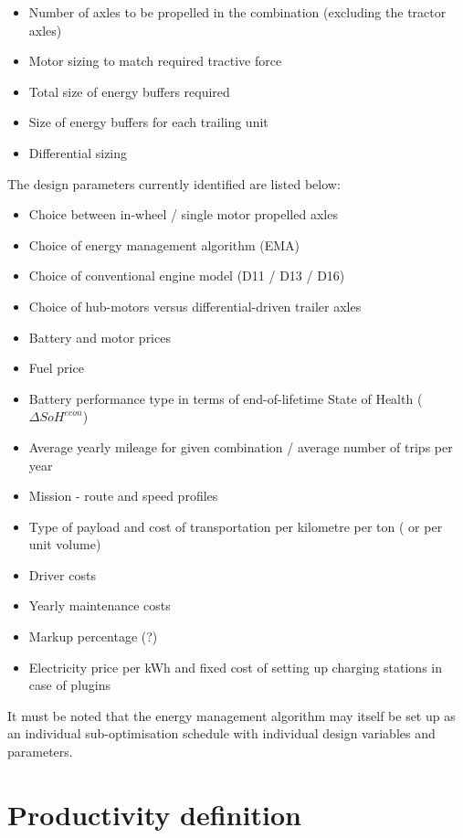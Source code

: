 \documentclass[ExampleMasters.tex]{subfiles}
\begin{document}
		\begin{itemize}
		\item Number of axles to be propelled in the combination (excluding the tractor axles)
		\item Motor sizing to match required tractive force
		\item Total size of energy buffers required
		\item Size of energy buffers for each trailing unit
		\item Differential sizing
		\end{itemize}

		The design parameters currently identified are listed below:

		\begin{itemize}
		\item Choice between in-wheel / single motor propelled axles
		\item Choice of energy management algorithm (EMA)
		\item Choice of conventional engine model (D11 / D13 / D16)
		\item Choice of hub-motors versus differential-driven trailer axles
		\item Battery and motor prices
		\item Fuel price
		\item Battery performance type in terms of end-of-lifetime State of Health ($\Delta SoH^{econ}$)
		\item Average yearly mileage for given combination / average number of trips per year
		\item Mission - route and speed profiles
		\item Type of payload and cost of transportation per kilometre per ton ( or per unit volume)
		\item Driver costs
		\item Yearly maintenance costs
		\item Markup percentage (?)
		\item Electricity price per kWh and fixed cost of setting up charging stations in case of plugins
		\end{itemize}

		It must be noted that the energy management algorithm may itself be set up as an individual sub-optimisation schedule with individual design variables and parameters.

	\section{Productivity definition}
\end{document}
